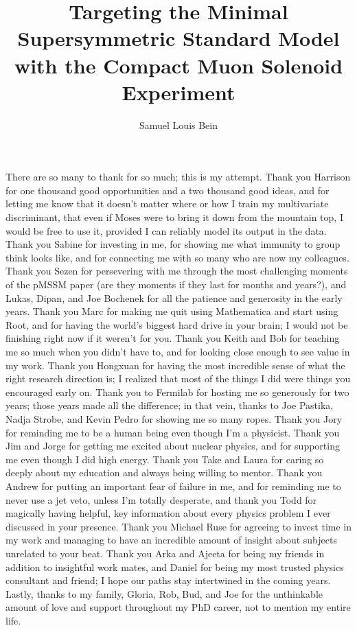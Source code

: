 \documentclass[12pt,expanded,copyright]{fsuthesis}
\title{Targeting the Minimal Supersymmetric Standard Model with the Compact Muon Solenoid Experiment}
\author{Samuel Louis Bein}
\begin{document}
\frontmatter
\maketitle
\makecommitteepage


\begin{acknowledgments}
There are so many to thank for so much; this is my attempt. Thank you Harrison for one thousand good opportunities and a two thousand good ideas, and for letting me know that it doesn't matter where or how I train my multivariate discriminant, that even if Moses were to bring it down from the mountain top, I would be free to use it, provided I can reliably model its output in the data. Thank you Sabine for investing in me, for showing me what immunity to group think looks like, and for connecting me with so many who are now my colleagues. Thank you Sezen for persevering with me through the most challenging moments of the pMSSM paper (are they moments if they last for months and years?), and Lukas, Dipan, and Joe Bochenek for all the patience and generosity in the early years. Thank you Marc for making me quit using Mathematica and start using Root, and for having the world's biggest hard drive in your brain; I would not be finishing right now if it weren't for you. Thank you Keith and Bob for teaching me so much when you didn't have to, and for looking close enough to see value in my work. Thank you Hongxuan for having the most incredible sense of what the right research direction is; I realized that most of the things I did were things you encouraged early on. Thank you to Fermilab for hosting me so generously for two years; those years made all the difference; in that vein, thanks to Joe Pastika, Nadja Strobe, and Kevin Pedro for showing me so many ropes. Thank you Jory for reminding me to be a human being even though I'm a physicist. Thank you Jim and Jorge for getting me excited about nuclear physics, and for supporting me even though I did high energy. Thank you Take and Laura for caring so deeply about my education and always being willing to mentor. Thank you Andrew for putting an important fear of failure in me, and for reminding me to never use a jet veto, unless I'm totally desperate, and thank you Todd for magically having helpful, key information about every physics problem I ever discussed in your presence. Thank you Michael Ruse for agreeing to invest time in my work and managing to have an incredible amount of insight about subjects unrelated to your beat. Thank you Arka and Ajeeta for being my friends in addition to insightful work mates, and Daniel for being my most trusted physics consultant and friend; I hope our paths stay intertwined in the coming years. Lastly, thanks to my family, Gloria, Rob, Bud, and Joe for the unthinkable amount of love and support throughout my PhD career, not to mention my entire life. 
\end{acknowledgments}
\end{document}
